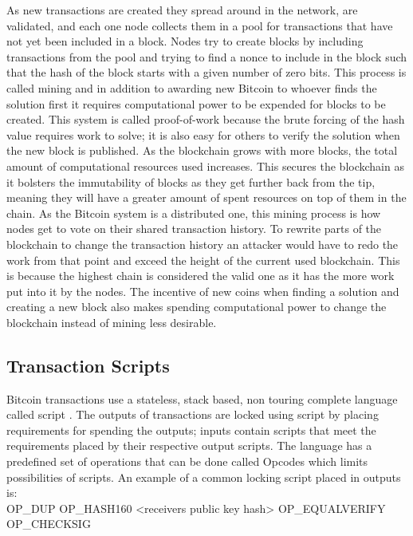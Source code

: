As new transactions are created they spread around in the network, are validated, and each one node collects them in a pool for transactions that have not yet been included in a block. Nodes try to create blocks by including transactions from the pool and trying to find a nonce to include in the block such that the hash of the block starts with a given number of zero bits. This process is called mining and in addition to awarding new Bitcoin to whoever finds the solution first it requires computational power to be expended for blocks to be created. This system is called proof-of-work because the brute forcing of the hash value requires work to solve; it is also easy for others to verify the solution when the new block is published. As the blockchain grows with more blocks, the total amount of computational resources used increases. This secures the blockchain as it bolsters the immutability of blocks as they get further back from the tip, meaning they will have a greater amount of spent resources on top of them in the chain. As the Bitcoin system is a distributed one, this mining process is how nodes get to vote on their shared transaction history.
To rewrite parts of the blockchain to change the transaction history an attacker would have to redo the work from that point and exceed the height of the current used blockchain. This is because the highest chain is considered the valid one as it has the more work put into it by the nodes. The incentive of new coins when finding a solution and creating a new block also makes spending computational power to change the blockchain instead of mining less desirable. 


\subsection{Transaction Scripts}
\label{subsec:scripts}

Bitcoin transactions use a stateless, stack based, non touring complete language called script \cite{antonopoulos2017mastering}.
The outputs of transactions are locked using script by placing requirements for spending the outputs; inputs contain scripts that meet the requirements placed by their respective output scripts. The language has a predefined set of operations that can be done called Opcodes which limits possibilities of scripts. 
An example of a common locking script placed in outputs is: 
\\

OP\_DUP OP\_HASH160 <receivers public key hash> OP\_EQUALVERIFY OP\_CHECKSIG
\\


